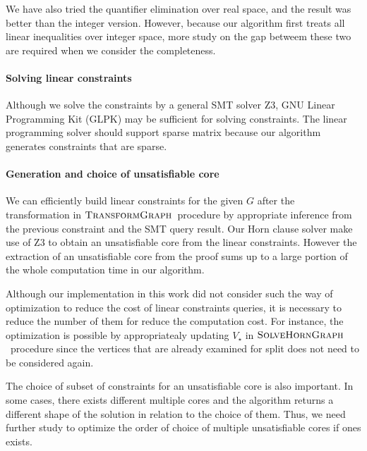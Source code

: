 We have also tried the quantifier elimination over real space, and the
result was better than the integer version.  However, because our
algorithm first treats all linear inequalities over integer space,
more study on the gap betweem these two are required when we consider
the completeness.


\paragraph{Solving linear constraints}
Although we solve the constraints by a general SMT solver Z3, GNU
Linear Programming Kit (GLPK) may be sufficient for solving
constraints.  The linear programming solver should support sparse
matrix because our algorithm generates constraints that are sparse.


\paragraph{Generation and choice of unsatisfiable core}
We can efficiently build linear constraints for the given $G$ after
the transformation in $\mbox{\sc TransformGraph}$~procedure by appropriate inference
from the previous constraint and the SMT query result.  Our Horn
clause solver make use of Z3 to obtain an unsatisfiable core from the
linear constraints.  However the extraction of an unsatisfiable core
from the proof sums up to a large portion of the whole computation
time in our algorithm.

Although our implementation in this work did not consider such the way
of optimization to reduce the cost of linear constraints queries, it
is necessary to reduce the number of them for reduce the computation
cost.  For instance, the optimization is possible by appropriatealy
updating $V_\star$ in $\mbox{\sc SolveHornGraph}$~procedure since the vertices that
are already examined for split does not need to be considered again.

The choice of subset of constraints for an unsatisfiable core is also
important.  In some cases, there exists different multiple cores and
the algorithm returns a different shape of the solution in relation to
the choice of them.  Thus, we need further study to optimize the order
of choice of multiple unsatisfiable cores if ones exists.


